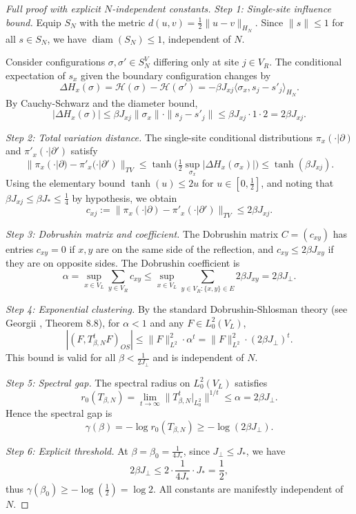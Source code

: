 \documentclass[11pt]{amsart}
\begin{document}
\begin{proof}[Full proof with explicit $N$-independent constants]
\emph{Step 1: Single-site influence bound.} Equip $S_N$ with the metric $d(u,v) = \frac{1}{2}\|u-v\|_{H_N}$. Since $\|s\| \le 1$ for all $s \in S_N$, we have $\operatorname{diam}(S_N) \le 1$, independent of $N$.

Consider configurations $\sigma, \sigma' \in S_N^V$ differing only at site $j \in V_R$. The conditional expectation of $s_x$ given the boundary configuration changes by
\[
  \Delta H_x(\sigma) = \mathcal{H}(\sigma) - \mathcal{H}(\sigma') = -\beta J_{xj}\langle \sigma_x, s_j - s'_j \rangle_{H_N}.
\]
By Cauchy-Schwarz and the diameter bound,
\[
  |\Delta H_x(\sigma)| \le \beta J_{xj} \|\sigma_x\| \cdot \|s_j - s'_j\| \le \beta J_{xj} \cdot 1 \cdot 2 = 2\beta J_{xj}.
\]

\emph{Step 2: Total variation distance.} The single-site conditional distributions $\pi_x(\cdot|\partial)$ and $\pi'_x(\cdot|\partial')$ satisfy
\[
  \|\pi_x(\cdot|\partial) - \pi'_x(\cdot|\partial')\|_{TV} \le \tanh\bigl(\tfrac{1}{2}\sup_{\sigma_x}|\Delta H_x(\sigma_x)|\bigr) \le \tanh(\beta J_{xj}).
\]
Using the elementary bound $\tanh(u) \le 2u$ for $u \in [0, \tfrac{1}{2}]$, and noting that $\beta J_{xj} \le \beta J_{\!*} \le \tfrac{1}{4}$ by hypothesis, we obtain
\[
  c_{xj} := \|\pi_x(\cdot|\partial) - \pi'_x(\cdot|\partial')\|_{TV} \le 2\beta J_{xj}.
\]

\emph{Step 3: Dobrushin matrix and coefficient.} The Dobrushin matrix $C = (c_{xy})$ has entries $c_{xy} = 0$ if $x,y$ are on the same side of the reflection, and $c_{xy} \le 2\beta J_{xy}$ if they are on opposite sides. The Dobrushin coefficient is
\[
  \alpha = \sup_{x \in V_L} \sum_{y \in V_R} c_{xy} \le \sup_{x \in V_L} \sum_{y \in V_R: \{x,y\} \in E} 2\beta J_{xy} = 2\beta J_{\perp}.
\]

\emph{Step 4: Exponential clustering.} By the standard Dobrushin-Shlosman theory (see Georgii \cite{Georgii1988}, Theorem 8.8), for $\alpha < 1$ and any $F \in L^2_0(V_L)$,
\[
  |(F, T_{\beta,N}^t F)_{OS}| \le \|F\|_{L^2}^2 \cdot \alpha^t = \|F\|_{L^2}^2 \cdot (2\beta J_{\perp})^t.
\]
This bound is valid for all $\beta < \frac{1}{2J_{\perp}}$ and is independent of $N$.

\emph{Step 5: Spectral gap.} The spectral radius on $L^2_0(V_L)$ satisfies
\[
  r_0(T_{\beta,N}) = \lim_{t \to \infty} \|T_{\beta,N}^t|_{L^2_0}\|^{1/t} \le \alpha = 2\beta J_{\perp}.
\]
Hence the spectral gap is
\[
  \gamma(\beta) = -\log r_0(T_{\beta,N}) \ge -\log(2\beta J_{\perp}).
\]

\emph{Step 6: Explicit threshold.} At $\beta = \beta_0 = \frac{1}{4J_{\!*}}$, since $J_{\perp} \le J_{\!*}$, we have
\[
  2\beta J_{\perp} \le 2 \cdot \frac{1}{4J_{\!*}} \cdot J_{\!*} = \frac{1}{2},
\]
thus $\gamma(\beta_0) \ge -\log(\tfrac{1}{2}) = \log 2$. All constants are manifestly independent of $N$.
\end{proof}
\end{document}
